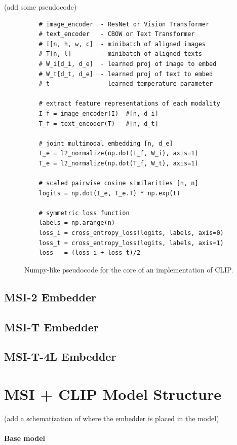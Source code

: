 \documentclass[a4paper, oneside, english]{sapthesis} %
\begin{document}
(add some pseudocode)

\begin{figure}[ht]
\centering %
    \begin{verbatim} 
    # image_encoder  - ResNet or Vision Transformer
    # text_encoder   - CBOW or Text Transformer
    # I[n, h, w, c]  - minibatch of aligned images
    # T[n, l]        - minibatch of aligned texts
    # W_i[d_i, d_e]  - learned proj of image to embed
    # W_t[d_t, d_e]  - learned proj of text to embed
    # t              - learned temperature parameter
    
    # extract feature representations of each modality
    I_f = image_encoder(I)  #[n, d_i]
    T_f = text_encoder(T)   #[n, d_t]
    
    # joint multimodal embedding [n, d_e]
    I_e = l2_normalize(np.dot(I_f, W_i), axis=1)
    T_e = l2_normalize(np.dot(T_f, W_t), axis=1)
    
    # scaled pairwise cosine similarities [n, n]
    logits = np.dot(I_e, T_e.T) * np.exp(t)
    
    # symmetric loss function
    labels = np.arange(n)
    loss_i = cross_entropy_loss(logits, labels, axis=0)
    loss_t = cross_entropy_loss(logits, labels, axis=1)
    loss   = (loss_i + loss_t)/2
    \end{verbatim}
\caption{Numpy-like pseudocode for the core of an implementation of CLIP.}
\label{fig:clipcode}
\end{figure}


\subsection{MSI-2 Embedder}
\subsection{MSI-T Embedder}
\subsection{MSI-T-4L Embedder}


\section{MSI + CLIP Model Structure}

(add a schematization of where the embedder is placed in the model)

\paragraph{Base model}
\end{document}
